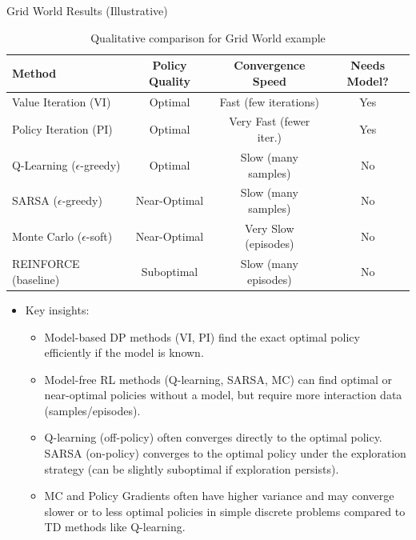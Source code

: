 \documentclass[10pt]{beamer}
\begin{document}
\begin{frame}{Grid World Results (Illustrative)}
    \begin{table}
        \centering
        \small
        \begin{tabular}{l c c c}
            \toprule
            \textbf{Method} & \textbf{Policy Quality} & \textbf{Convergence Speed} & \textbf{Needs Model?} \\
            \midrule
            Value Iteration (VI) & Optimal & Fast (few iterations) & Yes \\
            Policy Iteration (PI) & Optimal & Very Fast (fewer iter.) & Yes \\
            Q-Learning ($\epsilon$-greedy) & Optimal & Slow (many samples) & No \\
            SARSA ($\epsilon$-greedy) & Near-Optimal & Slow (many samples) & No \\
            Monte Carlo ($\epsilon$-soft) & Near-Optimal & Very Slow (episodes) & No \\
            REINFORCE (baseline) & Suboptimal & Slow (many episodes) & No \\
            \bottomrule
        \end{tabular}
         \caption{Qualitative comparison for Grid World example}
    \end{table}

    \begin{itemize}
        \item Key insights:
        \begin{itemize}
            \item Model-based DP methods (VI, PI) find the exact optimal policy efficiently if the model is known.
            \item Model-free RL methods (Q-learning, SARSA, MC) can find optimal or near-optimal policies without a model, but require more interaction data (samples/episodes).
            \item Q-learning (off-policy) often converges directly to the optimal policy. SARSA (on-policy) converges to the optimal policy under the exploration strategy (can be slightly suboptimal if exploration persists).
            \item MC and Policy Gradients often have higher variance and may converge slower or to less optimal policies in simple discrete problems compared to TD methods like Q-learning.
        \end{itemize}
    \end{itemize}
\end{frame}
\end{document}
